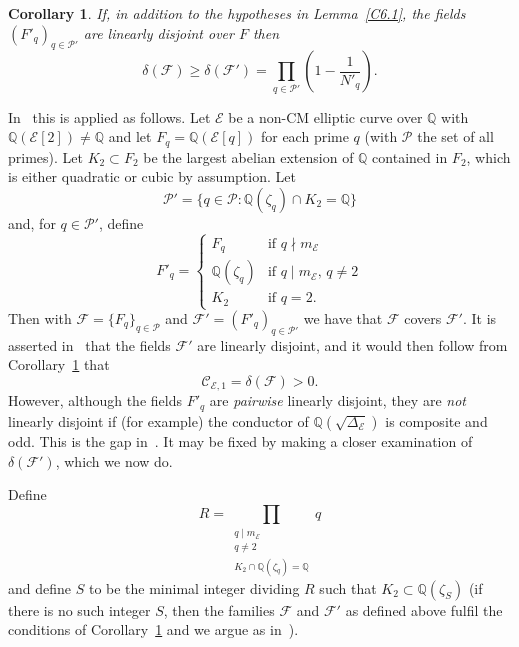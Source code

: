 \documentclass{amsart}
\theoremstyle{plain}
\newtheorem{cor}[theorem]{Corollary}
\theoremstyle{remark}
\newcommand{\Q}{\mathbb{Q}}
\newcommand{\E}{\mathcal{E}}
\newcommand{\Cc}{\mathcal{C}}
\newcommand{\Fc}{\mathcal{F}}
\newcommand{\Pc}{\mathcal{P}}
\begin{document}
\begin{cor} \label{C2b}
    If, in addition to the hypotheses in Lemma~\ref{C6.1}, the fields $(F'_q)_{q \in \mathcal{P}'}$ are linearly disjoint over $F$ then
    \[
    \delta(\mathcal{F}) \ge \delta(\mathcal{F}') =  \prod_{q \in \mathcal{P}'} \left(1-\frac{1}{N'_q}\right).
    \]
\end{cor}
In~\cite{CoMu} this is applied as follows. Let $\E$ be a non-CM elliptic curve over $\Q$ with $\Q(\E[2]) \ne \Q$ and let $F_q = \Q(\E[q])$ for each prime $q$ (with $\mathcal{P}$ the set of all primes). Let $K_2 \subset F_2$ be the largest abelian extension of $\Q$ contained in $F_2$, which is either quadratic or cubic by assumption. Let 
\[\mathcal{P}' = \{q \in \mathcal{P} : \Q(\zeta_q) \cap K_2 = \Q\}\]
and, for $q \in \mathcal{P}'$, define 
\[F'_q = \begin{cases} F_q & \text{if $q \nmid m_\E$} \\ 
\Q(\zeta_q) & \text{if $q \mid m_\E$, $q \ne 2$} \\
K_2 & \text{if $q = 2$}.
\end{cases}\]
Then with $\Fc = \{F_q\}_{q \in \Pc}$ and $\Fc' = (F'_q)_{q \in \Pc'}$ we have that $\Fc$ covers $\Fc'$. It is asserted in~\cite{CoMu} that the fields $\Fc'$ are linearly disjoint, and it would then follow from Corollary~\ref{C2b} that \[\Cc_{\E,1} = \delta(\Fc) > 0.\] However, although the fields $F'_q$ are \emph{pairwise} linearly disjoint, they are \emph{not} linearly disjoint if (for example) the conductor of $\Q(\sqrt{\Delta_\E})$ is composite and odd. This is the gap in~\cite[Section 6]{CoMu}. It may be fixed by making a closer examination of $\delta(\Fc')$, which we now do.

    Define 
    \[R = \prod_{\substack{q \mid m_\E\\ q \ne 2\\ K_2 \cap \Q(\zeta_q) = \Q}} q\] and define $S$ to be the minimal integer dividing $R$ such that $K_2 \subset \mathbb{Q}(\zeta_S)$ (if there is no such integer $S$, then the families $\mathcal{F}$ and $\mathcal{F}'$ as defined above fulfil the conditions of Corollary~\ref{C2b} and we argue as in~\cite{CoMu}).
    
\end{document}
